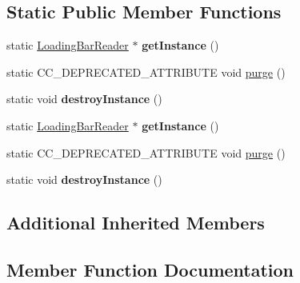 \subsection*{Static Public Member Functions}
\begin{DoxyCompactItemize}
\item 
\mbox{\label{classcocostudio_1_1LoadingBarReader_af3175e389014f96e5b524c67cb594945}} 
static \hyperlink{classcocostudio_1_1LoadingBarReader}{Loading\+Bar\+Reader} $\ast$ {\bfseries get\+Instance} ()
\item 
static C\+C\+\_\+\+D\+E\+P\+R\+E\+C\+A\+T\+E\+D\+\_\+\+A\+T\+T\+R\+I\+B\+U\+TE void \hyperlink{classcocostudio_1_1LoadingBarReader_a6a6b46011bdf6cfb6d8e63a55bd9afa7}{purge} ()
\item 
\mbox{\label{classcocostudio_1_1LoadingBarReader_a4d68d34a400623835ec7ebafec91a69a}} 
static void {\bfseries destroy\+Instance} ()
\item 
\mbox{\label{classcocostudio_1_1LoadingBarReader_acdb8180647775af68d2d5c8e108b4ada}} 
static \hyperlink{classcocostudio_1_1LoadingBarReader}{Loading\+Bar\+Reader} $\ast$ {\bfseries get\+Instance} ()
\item 
static C\+C\+\_\+\+D\+E\+P\+R\+E\+C\+A\+T\+E\+D\+\_\+\+A\+T\+T\+R\+I\+B\+U\+TE void \hyperlink{classcocostudio_1_1LoadingBarReader_a6a6b46011bdf6cfb6d8e63a55bd9afa7}{purge} ()
\item 
\mbox{\label{classcocostudio_1_1LoadingBarReader_af4ccc8a34b98029d48c5794f4dc23fd8}} 
static void {\bfseries destroy\+Instance} ()
\end{DoxyCompactItemize}
\subsection*{Additional Inherited Members}


\subsection{Member Function Documentation}
\mbox{\label{classcocostudio_1_1LoadingBarReader_a6a6b46011bdf6cfb6d8e63a55bd9afa7}} 
